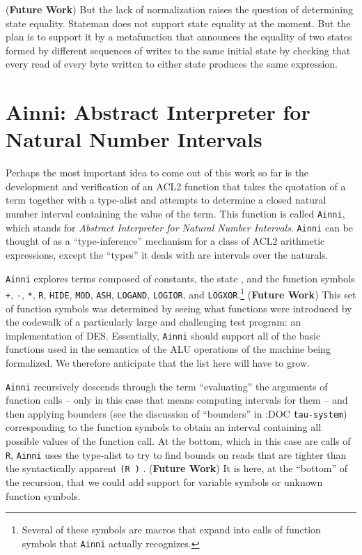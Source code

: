 \documentclass[submission,copyright,creativecommons]{eptcs}
\newcommand{\ptt}[1]{\tt{#1}}
\begin{document}
({\bf{Future Work}}) But the lack of normalization raises the question of
determining state equality.  Stateman does not support state equality at the
moment.  But the plan is to support it by a metafunction that announces the
equality of two states formed by different sequences of writes to the same
initial state by checking that every read of every byte written to either
state produces the same expression.

\section{Ainni:  Abstract Interpreter for Natural Number Intervals}
\label{ainni}

Perhaps the most important idea to come out of this work
so far is the development and verification of an ACL2 function that takes the
quotation of a term together with a type-alist and attempts to determine a
closed natural number interval containing the value of the term.  This
function is called {\ptt{Ainni}}, which stands for {\em{Abstract Interpreter
    for Natural Number Intervals}}.  {\ptt{Ainni}} can be thought of as a
``type-inference'' mechanism for a class of ACL2 arithmetic expressions,
except the ``types'' it deals with are intervals over the naturals.

{\ptt{Ainni}} explores terms composed of constants, the state , and the
function symbols {\ptt{+}}, {\ptt{-}}, {\ptt{*}}, {\ptt{R}}, {\ptt{HIDE}},
{\ptt{MOD}}, {\ptt{ASH}}, {\ptt{LOGAND}}, {\ptt{LOGIOR}}, and
{\ptt{LOGXOR}}.\footnote{Several of these symbols are macros that expand into
  calls of function symbols that {\ptt{Ainni}} actually recognizes.}  ({\bf{Future Work}})
This set of function symbols was determined by seeing what functions were
introduced by the codewalk of a particularly large and challenging test
program: an implementation of DES.  Essentially, {\ptt{Ainni}} should support
all of the basic functions used in the semantics of the ALU operations of the
machine being formalized.  We therefore anticipate that the list here will
have to grow.

{\ptt{Ainni}} recursively descends through the term ``evaluating'' the
arguments of function calls -- only in this case that means computing
intervals for them -- and then applying bounders (see the discussion of ``bounders'' in :DOC
{\ptt{tau-system}}) corresponding to the function symbols to obtain an
interval containing all possible values of the function call.  At the bottom,
which in this case are calls of {\ptt{R}}, {\ptt{Ainni}} uses the type-alist
to try to find bounds on reads that are tighter than the syntactically
apparent  {\ptt{(R   )}} .  ({\bf{Future
    Work}}) It is here, at the ``bottom'' of the recursion, that we could add
support for variable symbols or unknown function symbols.
\end{document}

